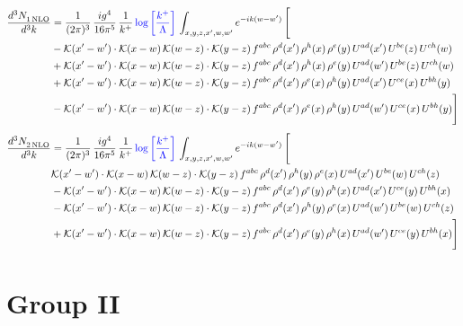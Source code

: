 \documentclass[9pt]{article}
\numberwithin{equation}{section}
\begin{document}
\begin{align}
    \frac{d^{3}N_{1\,\rm NLO}^{\rm}}{d^{3}k}  & = \frac{1}{(2\pi)^{3}}\, \frac{ig^{4}}{16\pi^{5}}\, \frac{1}{k^{+}}\, {\color{blue}\log{\left[\frac{k^{+}}{\Lambda}\right]}}\,\int_{x,y,z,x^{\prime},w,w^{\prime}}e^{-ik(w-w^{\prime})}\, \Bigg[\notag \\ & -\mathcal{K}(x'-w')\cdot \mathcal{K}(x-w)\, \mathcal{K}(w-z)\cdot \mathcal{K}(y-z)\,f^{abc}\,\rho^{d}(x')\,\rho^{h}(x)\,\rho^{e}(y)\,U^{ad}(x')\,U^{be}(z)\,U^{ch}(w)\notag \\ & + \mathcal{K}(x'-w')\cdot \mathcal{K}(x-w)\, \mathcal{K}(w-z)\cdot \mathcal{K}(y-z)\,f^{abc}\,\rho^{d}(x')\,\rho^{h}(x)\,\rho^{e}(y)\,U^{ad}(w')\,U^{be}(z)\,U^{ch}(w)\notag \\ & +\mathcal{K}(x'-w')\cdot \mathcal{K}(x-w)\, \mathcal{K}(w-z)\cdot \mathcal{K}(y-z)\,f^{abc}\,\rho^{d}(x')\,\rho^{e}(x)\,\rho^{h}(y)\,U^{ad}(x')\,U^{ce}(x)\,U^{bh}(y)\notag \\ & -\mathcal{K}(x'-w')\cdot \mathcal{K}(x-w)\, \mathcal{K}(w-z)\cdot \mathcal{K}(y-z)\,f^{abc}\,\rho^{d}(x')\,\rho^{e}(x)\,\rho^{h}(y)\,U^{ad}(w')\,U^{ce}(x)\,U^{bh}(y) \Bigg]
\end{align}
\begin{align}
    \frac{d^{3}N_{2\,\rm NLO}^{\rm}}{d^{3}k}  & = \frac{1}{(2\pi)^{3}}\, \frac{ig^{4}}{16\pi^{5}}\, \frac{1}{k^{+}}\, {\color{blue}\log{\left[\frac{k^{+}}{\Lambda}\right]}}\,\int_{x,y,z,x^{\prime},w,w^{\prime}}e^{-ik(w-w^{\prime})}\, \Bigg[\notag \\ & \mathcal{K}(x'-w')\cdot \mathcal{K}(x-w)\, \mathcal{K}(w-z)\cdot \mathcal{K}(y-z)\,f^{abc}\,\rho^{d}(x')\,\rho^{h}(y)\,\rho^{e}(x)\,U^{ad}(x')\,U^{be}(w)\,U^{ch}(z)\notag \\ & - \mathcal{K}(x'-w')\cdot \mathcal{K}(x-w)\, \mathcal{K}(w-z)\cdot \mathcal{K}(y-z)\,f^{abc}\,\rho^{d}(x')\,\rho^{e}(y)\,\rho^{h}(x)\,U^{ad}(x')\,U^{ce}(y)\,U^{bh}(x)\notag \\ & -\mathcal{K}(x'-w')\cdot \mathcal{K}(x-w)\, \mathcal{K}(w-z)\cdot \mathcal{K}(y-z)\,f^{abc}\,\rho^{d}(x')\,\rho^{h}(y)\,\rho^{e}(x)\,U^{ad}(w')\,U^{be}(w)\,U^{ch}(z)\,\notag \\ & + \mathcal{K}(x'-w')\cdot \mathcal{K}(x-w)\, \mathcal{K}(w-z)\cdot \mathcal{K}(y-z)\,f^{abc}\,\rho^{d}(x')\,\rho^{e}(y)\,\rho^{h}(x)\,U^{ad}(w')\,U^{ce}(y)\,U^{bh}(x) \Bigg]
\end{align}
\section{Group II}
\end{document}
